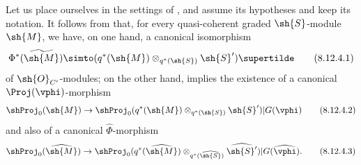 \begin{env}[8.12.4]
\label{II.8.12.4}
Let us place ourselves in the settings of , and assume its hypotheses and keep its notation.
It follows from  that, for every quasi-coherent graded $\sh{S}$-module $\sh{M}$, we have, on one hand, a canonical isomorphism
\[
\label{II.8.12.4.1}
    \Phi^*(\widetilde{\sh{M}}) \simto (q^*(\sh{M})\otimes_{q^*(\sh{S})}\sh{S}')\supertilde
\tag{8.12.4.1}
\]
of $\sh{O}_{C'}$-modules;
on the other hand,  implies the existence of a canonical $\Proj(\vphi)$-morphism
\[
\label{II.8.12.4.2}
    \shProj_0(\sh{M}) \to \shProj_0(q^*(\sh{M})\otimes_{q^*(\sh{S})}\sh{S}')|G(\vphi)
\tag{8.12.4.2}
\]
and also of a canonical $\widehat{\Phi}$-morphism
\[
\label{II.8.12.4.3}
    \shProj_0(\widehat{\sh{M}}) \to \shProj_0(q^*(\widehat{\sh{M}})\otimes_{q^*(\widehat{\sh{S}})}\widehat{\sh{S}'})|G(\widehat{\vphi}).
\tag{8.12.4.3}
\]
\end{env}

